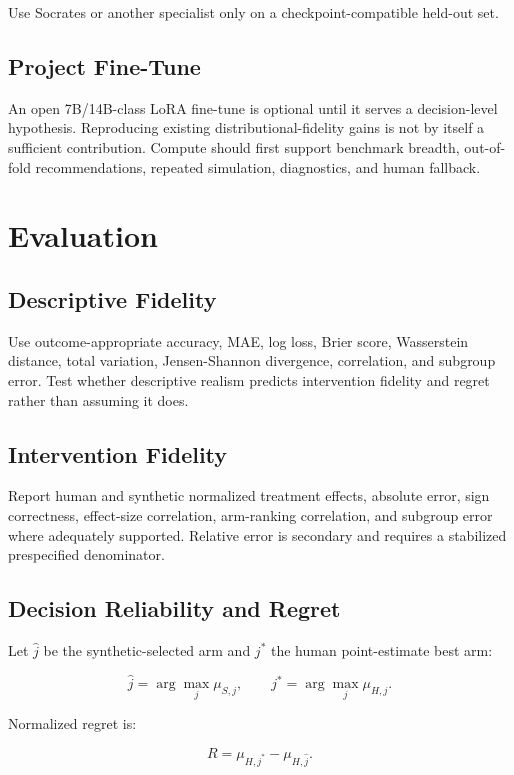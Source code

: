 \documentclass[11pt]{article}
\begin{document}
Use Socrates or another specialist only on a checkpoint-compatible held-out set.

\subsection{Project Fine-Tune}

An open 7B/14B-class LoRA fine-tune is optional until it serves a decision-level hypothesis. Reproducing existing distributional-fidelity gains is not by itself a sufficient contribution. Compute should first support benchmark breadth, out-of-fold recommendations, repeated simulation, diagnostics, and human fallback.

\section{Evaluation}

\subsection{Descriptive Fidelity}

Use outcome-appropriate accuracy, MAE, log loss, Brier score, Wasserstein distance, total variation, Jensen-Shannon divergence, correlation, and subgroup error. Test whether descriptive realism predicts intervention fidelity and regret rather than assuming it does.

\subsection{Intervention Fidelity}

Report human and synthetic normalized treatment effects, absolute error, sign correctness, effect-size correlation, arm-ranking correlation, and subgroup error where adequately supported. Relative error is secondary and requires a stabilized prespecified denominator.

\subsection{Decision Reliability and Regret}

Let $\hat{j}$ be the synthetic-selected arm and $j^*$ the human point-estimate best arm:

\[
\hat{j}=\arg\max_j \mu_{S,j}, \qquad
j^*=\arg\max_j \mu_{H,j}.
\]

Normalized regret is:

\[
R=\mu_{H,j^*}-\mu_{H,\hat{j}}.
\]
\end{document}
